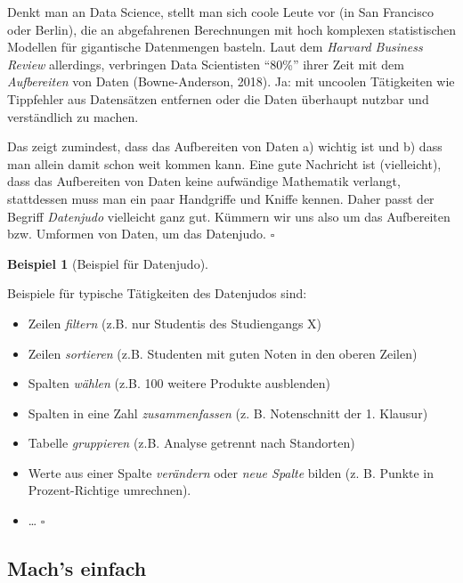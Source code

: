 \documentclass[
  letterpaper,
  twoside,
  open=any]{scrbook}
\providecommand{\tightlist}{%
  \setlength{\itemsep}{0pt}\setlength{\parskip}{0pt}}\usepackage{longtable,booktabs,array}
\theoremstyle{definition}
\theoremstyle{definition}
\newtheorem{example}{Beispiel}[chapter]
\theoremstyle{definition}
\theoremstyle{remark}
\begin{document}
Denkt man an Data Science, stellt man sich coole Leute vor (in San
Francisco oder Berlin), die an abgefahrenen Berechnungen mit hoch
komplexen statistischen Modellen für gigantische Datenmengen basteln.
Laut dem \emph{Harvard Business Review} allerdings, verbringen Data
Scientisten \enquote{80\%} ihrer Zeit mit dem \emph{Aufbereiten} von
Daten (Bowne-Anderson, 2018). Ja: mit uncoolen Tätigkeiten wie
Tippfehler aus Datensätzen entfernen oder die Daten überhaupt nutzbar
und verständlich zu machen.

Das zeigt zumindest, dass das Aufbereiten von Daten a) wichtig ist und
b) dass man allein damit schon weit kommen kann. Eine gute Nachricht ist
(vielleicht), dass das Aufbereiten von Daten keine aufwändige Mathematik
verlangt, stattdessen muss man ein paar Handgriffe und Kniffe kennen.
Daher passt der Begriff \emph{Datenjudo} vielleicht ganz gut. Kümmern
wir uns also um das Aufbereiten bzw. Umformen von Daten, um das
Datenjudo. \(\square\)

\begin{example}[Beispiel für
Datenjudo]\protect\hypertarget{exm-datenjudo}{}\label{exm-datenjudo}

Beispiele für typische Tätigkeiten des Datenjudos sind:

\begin{itemize}
\tightlist
\item
  Zeilen \emph{filtern} (z.B. nur Studentis des Studiengangs X)
\item
  Zeilen \emph{sortieren} (z.B. Studenten mit guten Noten in den oberen
  Zeilen)
\item
  Spalten \emph{wählen} (z.B. 100 weitere Produkte ausblenden)
\item
  Spalten in eine Zahl \emph{zusammenfassen} (z. B. Notenschnitt der 1.
  Klausur)
\item
  Tabelle \emph{gruppieren} (z.B. Analyse getrennt nach Standorten)
\item
  Werte aus einer Spalte \emph{verändern} oder \emph{neue Spalte} bilden
  (z. B. Punkte in Prozent-Richtige umrechnen).
\item
  \ldots{} \(\square\)
\end{itemize}

\end{example}

\subsection{Mach's einfach}\label{machs-einfach}
\end{document}
